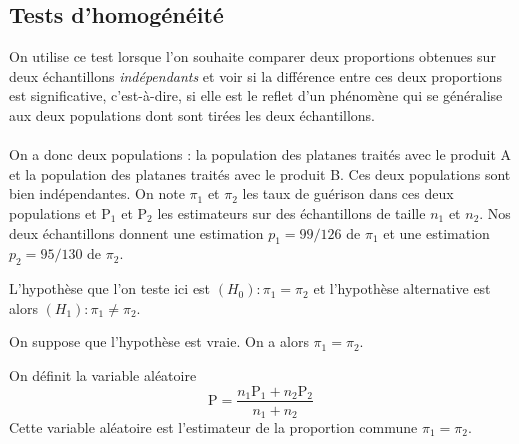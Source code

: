 \documentclass[12pt, a4paper]{book}
\numberwithin{equation}{section}
\begin{document}
\subsection{Tests d'homogénéité}

On utilise ce test lorsque l'on souhaite comparer deux proportions obtenues sur deux échantillons
{\it indépendants} et voir si la différence entre ces deux proportions est significative, c'est-à-dire, 
si elle est le reflet d'un phénomène qui se généralise aux deux populations dont sont tirées les deux échantillons.\\

\\

On a donc deux populations : la population des platanes traités avec le produit A et 
la population des platanes traités avec le produit B. Ces deux populations sont bien indépendantes.
On note $\pi_1$ et $\pi_2$ les taux de guérison
dans ces deux populations et $\mathrm{P}_1$ et $\mathrm{P}_2$ les estimateurs sur des échantillons de taille $n_1$ 
et $n_2$. 
Nos deux échantillons donnent une estimation $p_1=99/126$ de $\pi_1$ et une estimation $p_2 =95/130$
de $\pi_2$.

L'hypothèse que l'on teste ici est $(H_0) : \pi_1=\pi_2$
et l'hypothèse alternative est alors $(H_1) : \pi_1 \neq \pi_2$.

On suppose que l'hypothèse est vraie. On a alors $\pi_1=\pi_2$. 

On définit la variable aléatoire 
$$
\mathrm{P}=\frac{n_1 \mathrm{P}_1 + n_2 \mathrm{P}_2}{n_1+n_2}
$$
Cette variable aléatoire est l'estimateur de la proportion commune $\pi_1=\pi_2$.
\end{document}

